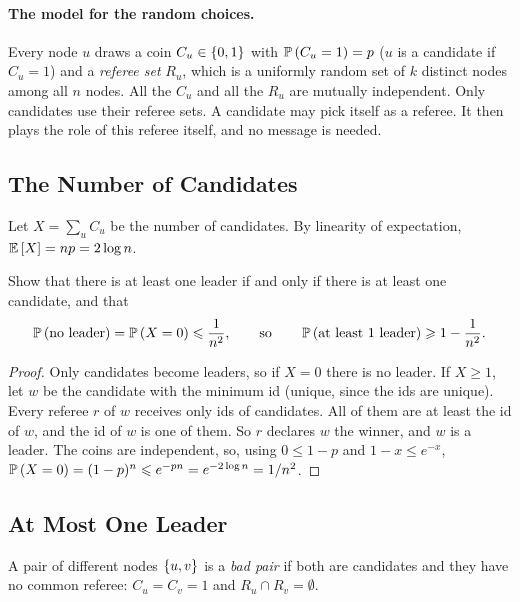 \paragraph{The model for the random choices.} Every node $u$ draws a coin $C_u \in \left\lbrace0,1\right\rbrace$ with
$\operatorname{\mathbb{P}}\left(C_u = 1\right) = p$ ($u$ is a candidate if $C_u = 1$) and a \emph{referee set} $R_u$, which is a
uniformly random set of $k$ distinct nodes among all $n$ nodes. All the $C_u$ and all the $R_u$ are
mutually independent. Only candidates use their referee sets. A candidate may pick itself as a
referee. It then plays the role of this referee itself, and no message is needed.

\subsection{The Number of Candidates}

Let $X = \sum_{u} C_u$ be the number of candidates. By linearity of expectation,
$\operatorname{\mathbb{E}}\left[X\right] = np = 2 \log n$.

\begin{exercisebox}
\begin{exercise}\label{ex:atleast-0908}\label{thm:leader-atleast-0908}
    Show that there is at least one leader if and only if there is at least one candidate, and that
    \[\operatorname{\mathbb{P}}\left(\text{no leader}\right) = \operatorname{\mathbb{P}}\left(X = 0\right) \leqslant \frac{1}{n^2},
        \qquad\text{so}\qquad
        \operatorname{\mathbb{P}}\left(\text{at least $1$ leader}\right) \geqslant 1 - \frac{1}{n^2}.\]
\end{exercise}
\tcblower
\begin{proof}
    Only candidates become leaders, so if $X = 0$ there is no leader. If $X \geq 1$, let
    $w$ be the candidate with the minimum id (unique, since the ids are unique). Every referee $r$
    of $w$ receives only ids of candidates. All of them are at least the id of $w$, and the id of
    $w$ is one of them. So $r$ declares $w$ the winner, and $w$ is a leader. The coins are
    independent, so, using $0 \leq 1 - p$ and $1 - x \leq e^{-x}$,
    $\operatorname{\mathbb{P}}\left(X = 0\right) = (1 - p)^{n} \leqslant e^{-pn} = e^{-2 \log n} = 1/n^2$.
\end{proof}
\end{exercisebox}

\subsection{At Most One Leader}

A pair of different nodes $\left\lbrace u,v\right\rbrace$ is a \emph{bad pair} if both are candidates and they have no
common referee: $C_u = C_v = 1$ and $R_u \cap R_v = \emptyset$.

